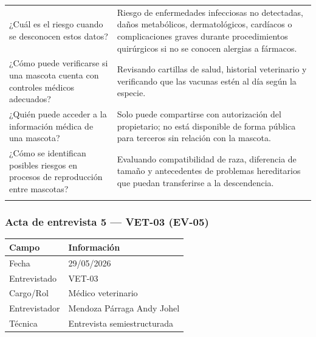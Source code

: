 \documentclass[journal,onecolumn]{IEEEtran}
\begin{document}
{\begin{longtable}{@{}p{5.6cm} p{9.4cm}@{}}
		¿Cuál es el riesgo cuando se desconocen estos datos? & Riesgo de enfermedades infecciosas no detectadas, daños metabólicos, dermatológicos, cardíacos o complicaciones graves durante procedimientos quirúrgicos si no se conocen alergias a fármacos. \\ \addlinespace
		
		¿Cómo puede verificarse si una mascota cuenta con controles médicos adecuados? & Revisando cartillas de salud, historial veterinario y verificando que las vacunas estén al día según la especie. \\ \addlinespace
		
		¿Quién puede acceder a la información médica de una mascota? & Solo puede compartirse con autorización del propietario; no está disponible de forma pública para terceros sin relación con la mascota. \\ \addlinespace
		
		¿Cómo se identifican posibles riesgos en procesos de reproducción entre mascotas? & Evaluando compatibilidad de raza, diferencia de tamaño y antecedentes de problemas hereditarios que puedan transferirse a la descendencia. \\ \addlinespace
		
	\end{longtable}
}


\subsubsection*{Acta de entrevista 5 --- VET-03 (EV-05)}

\begin{table}[H]
	\centering\small
	\begin{tabularx}{\textwidth}{@{}l X@{}}
		\toprule
		\textbf{Campo} & \textbf{Información} \\
		\midrule
		
		Fecha & 29/05/2026 \\
		
		Entrevistado & VET-03 \\
		
		Cargo/Rol & Médico veterinario \\
		
		Entrevistador & Mendoza Párraga Andy Johel \\
		
		Técnica & Entrevista semiestructurada \\
		
		\bottomrule
	\end{tabularx}
\end{table}
\end{document}
